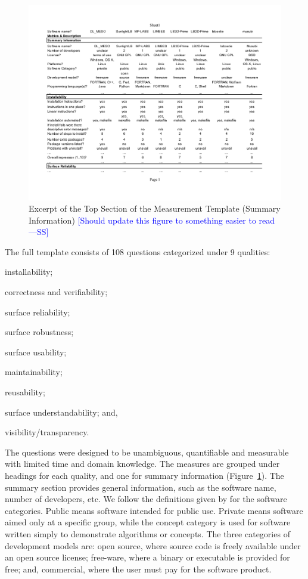 \documentclass[final, 3p, times, authoryear]{elsarticle}
\newcommand{\authornote}[3]{\textcolor{#1}{[#3 ---#2]}}
\newcommand{\authornote}[3]{}
\newcommand{\wss}[1]{\authornote{blue}{SS}{#1}} %
\begin{document}
\begin{figure}[!ht]
	\begin{center}
	  \includegraphics[width=1.0\textwidth]{./figures/measurement_template}
	  \caption{Excerpt of the Top Section of the Measurement Template (Summary
	  Information) \wss{Should update this figure to something easier to read}}
	  \label{measurement_template_image}
	\end{center}
\end{figure}

The full template consists of 108 questions categorized under 9 qualities:
\begin{inparaenum}
	\item installability;
	\item correctness and verifiability;
	\item surface reliability;
	\item surface robustness;
	\item surface usability;
	\item maintainability;
	\item reusability;
	\item surface understandability; and,
	\item visibility/transparency. 
\end{inparaenum} 
The questions were designed to be unambiguous, quantifiable and measurable with
limited time and domain knowledge. The measures are grouped under headings for
each quality, and one for summary information
(Figure~\ref{measurement_template_image}).   The summary section provides
general information, such as the software name, number of developers, etc.  We
follow the definitions given by \citet{GewaltigAndCannon2012} for the software
categories.  Public means software intended for public use.  Private means
software aimed only at a specific group, while the concept category is used for
software written simply to demonstrate algorithms or concepts. The three
categories of development models are: open source, where source code is freely
available under an open source license; free-ware, where a binary or executable
is provided for free; and, commercial, where the user must pay for the software
product.  
\end{document}
